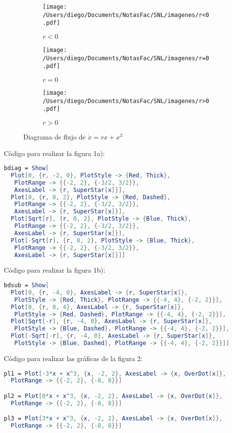 \begin{figure}[!tbp]
  \begin{subfigure}[b]{0.45\textwidth}
    \texttt{[image: /Users/diego/Documents/NotasFac/SNL/imagenes/r<0.pdf]}
    \caption{$r<0$}
  \end{subfigure}
  \hfill
  \begin{subfigure}[b]{0.45\textwidth}
    \texttt{[image: /Users/diego/Documents/NotasFac/SNL/imagenes/r=0.pdf]}
    \caption{$r=0$}
  \end{subfigure}
  \begin{subfigure}[b]{0.45\textwidth}
    \texttt{[image: /Users/diego/Documents/NotasFac/SNL/imagenes/r>0.pdf]}
    \caption{$r>0$}
  \end{subfigure}
  \caption{Diagrama de flujo de $\dot{{x}} {=rx+x^3}$}
\end{figure}

Código para realizar la figura 1a):
\begin{lstlisting}[language=Mathematica]
bdiag = Show[
  Plot[0, {r, -2, 0}, PlotStyle -> {Red, Thick}, 
   PlotRange -> {{-2, 2}, {-3/2, 3/2}}, 
   AxesLabel -> {r, SuperStar[x]}], 
  Plot[0, {r, 0, 2}, PlotStyle -> {Red, Dashed}, 
   PlotRange -> {{-2, 2}, {-3/2, 3/2}}, 
   AxesLabel -> {r, SuperStar[x]}], 
  Plot[Sqrt[r], {r, 0, 2}, PlotStyle -> {Blue, Thick}, 
   PlotRange -> {{-2, 2}, {-3/2, 3/2}}, 
   AxesLabel -> {r, SuperStar[x]}], 
  Plot[-Sqrt[r], {r, 0, 2}, PlotStyle -> {Blue, Thick}, 
   PlotRange -> {{-2, 2}, {-3/2, 3/2}}, 
   AxesLabel -> {r, SuperStar[x]}]]
\end{lstlisting}  
Código para realizar la figura 1b):
\begin{lstlisting}[language=Mathematica]
bdsub = Show[
  Plot[0, {r, -4, 0}, AxesLabel -> {r, SuperStar[x]}, 
   PlotStyle -> {Red, Thick}, PlotRange -> {{-4, 4}, {-2, 2}}], 
  Plot[0, {r, 0, 4}, AxesLabel -> {r, SuperStar[x]}, 
   PlotStyle -> {Red, Dashed}, PlotRange -> {{-4, 4}, {-2, 2}}], 
  Plot[Sqrt[-r], {r, -4, 0}, AxesLabel -> {r, SuperStar[x]}, 
   PlotStyle -> {Blue, Dashed}, PlotRange -> {{-4, 4}, {-2, 2}}], 
  Plot[-Sqrt[-r], {r, -4, 0}, AxesLabel -> {r, SuperStar[x]}, 
   PlotStyle -> {Blue, Dashed}, PlotRange -> {{-4, 4}, {-2, 2}}]]
\end{lstlisting}
Código para realizar las gráficas de la figura 2:
\begin{lstlisting}[language=Mathematica]
pl1 = Plot[-3*x + x^3, {x, -2, 2}, AxesLabel -> {x, OverDot[x]}, 
  PlotRange -> {{-2, 2}, {-8, 8}}]

pl2 = Plot[0*x + x^3, {x, -2, 2}, AxesLabel -> {x, OverDot[x]}, 
  PlotRange -> {{-2, 2}, {-8, 8}}]

pl3 = Plot[3*x + x^3, {x, -2, 2}, AxesLabel -> {x, OverDot[x]}, 
  PlotRange -> {{-2, 2}, {-8, 8}}]
\end{lstlisting}
 
